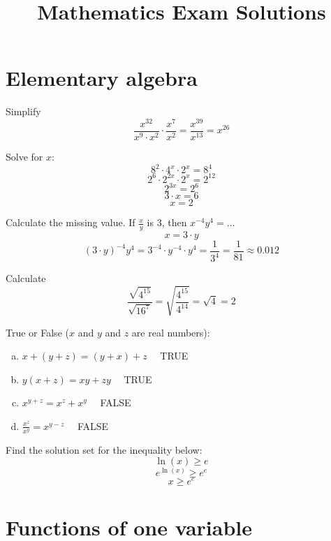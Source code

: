 \documentclass[10pt]{article}
\newenvironment{problem}[2][Problem]{\begin{trivlist}
\item[\hskip \labelsep {\bfseries #1}\hskip \labelsep {\bfseries #2.}]}{\end{trivlist}}
\begin{document}
 
\title{Mathematics Exam Solutions}
\date{}
\maketitle

 \section{Elementary algebra}
 
\begin{problem}{1.1}
Simplify
$$\frac{x^{32}}{x^9 \cdot x^2} \cdot \frac{x^7}{x^2} = \frac{x^{39}}{x^{13}} = x^{26}$$
\end{problem}

\begin{problem}{1.2}
Solve for $x$:
$$8^2 \cdot 4^x \cdot 2^x = 8^4$$ 
$$2^6 \cdot 2^{2x} \cdot 2^x = 2^{12} $$ 
$$2^{3x} = 2^6$$ 
$$ 3 \cdot x = 6 $$
$$ x = 2 $$
\end{problem}

\begin{problem}{1.3}
Calculate the missing value. If $\frac{x}{y}$ is 3, then $x^{-4}y^{4}=\dots$
$$ x = 3 \cdot y $$
$$ (3\cdot y)^{-4}y^4 = 3^{-4}\cdot y^{-4} \cdot y^{4} = \frac{1}{3^4} = \frac{1}{81} \approx 0.012 $$
\end{problem}

\begin{problem}{1.4}
Calculate
$$\frac{\sqrt{4^{15}}}{\sqrt{16^7}} = \sqrt{\frac{4^{15}}{4^{14}}} = \sqrt{4} = 2 $$
\end{problem}

\begin{problem}{1.5}
True or False ($x$ and $y$ and $z$ are real numbers):
\begin{enumerate}[(a)]
    \item $x+(y+z)=(y+x)+z$ $\ \ \ $   TRUE
    \item $y(x+z)=xy+zy$  $\ \ \ $  TRUE
    \item $x^{y+z}=x^z+x^y$  $\ \ \ $  FALSE
    \item $\frac{x^z}{x^y}=x^{y-z}$  $\ \ \ $  FALSE
\end{enumerate}
\end{problem}

\begin{problem}{1.6}
Find the solution set for the inequality below:
$$\ln(x) \ge e$$
$$ e^{\ln(x)} \ge e^e$$
$$ x \ge e^e $$
\end{problem}

\section{Functions of one variable}
\end{document}
